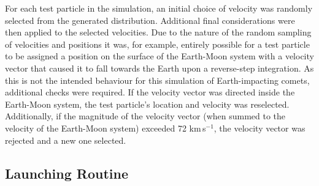 


For each test particle in the simulation, an initial choice of velocity was randomly selected from the generated distribution. Additional final considerations were then applied to the selected velocities. Due to the nature of the random sampling of velocities and positions it was, for example, entirely possible for a test particle to be assigned a position on the surface of the Earth-Moon system with a velocity vector that caused it to fall towards the Earth upon a reverse-step integration. As this is not the intended behaviour for this simulation of Earth-impacting comets, additional checks were required. If the velocity vector was directed inside the Earth-Moon system, the test particle's location and velocity was reselected. Additionally, if the magnitude of the velocity vector (when summed to the velocity of the Earth-Moon system) exceeded 72 km$\,$s$^{-1}$, the velocity vector was rejected and a new one selected.

\clearpage
\subsection{Launching Routine}

